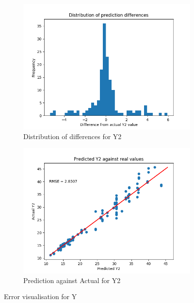 \documentclass[12pt]{article}
\begin{document}
\begin{figure}[!ht]
\centering
\begin{subfigure}{.5\textwidth}
  \centering
  \includegraphics[width=\linewidth]{images/Y2errordist}
  \caption{Distribution of differences for Y2}
  \label{fig:y2diffdist}
\end{subfigure}%
\begin{subfigure}{.5\textwidth}
  \centering
  \includegraphics[width=\linewidth]{images/Y2scatter}
  \caption{Prediction against Actual for Y2}
  \label{fig:y2diffscatter}
\end{subfigure}
\caption{Error visualisation for Y}
\label{fig:y2error}
\end{figure}
\end{document}
